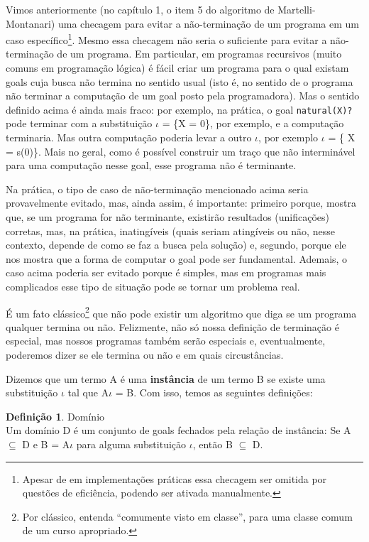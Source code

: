 \documentclass{article}
\theoremstyle{definition}
\newtheorem{definition}{Definição}[section]
\theoremstyle{remark}
\begin{document}
Vimos anteriormente (no capítulo 1, o item 5 do algoritmo de Martelli-Montanari) uma checagem para evitar a não-terminação de um programa em um caso específico\footnote{Apesar de em implementações práticas essa checagem ser omitida por questões de eficiência, podendo ser ativada manualmente.}. Mesmo essa checagem não seria o suficiente para evitar a não-terminação de um programa. Em
particular, em programas recursivos (muito comuns em programação lógica) é fácil criar um programa para o qual existam goals cuja busca não termina no sentido usual (isto é, no sentido de o programa não terminar a computação de um goal posto pela programadora). Mas o sentido definido acima é ainda mais fraco: por exemplo, na prática, o goal {\tt natural(X)?} pode terminar com a substituição $\iota$ = \{X = 0\}, por exemplo, e a computação terminaria. Mas outra computação poderia
levar a outro $\iota$, por exemplo $\iota$ = \{ X = s(0)\}. Mais no geral, como é possível construir um traço que não interminável para uma computação nesse goal, esse programa não é terminante.

Na prática, o tipo de caso de não-terminação mencionado acima seria provavelmente evitado, mas, ainda assim, é importante: primeiro porque, mostra que, se um programa for não terminante, existirão resultados (unificações) corretas, mas, na prática, inatingíveis (quais seriam atingíveis ou não, nesse contexto, depende de como se faz a busca pela solução) e, segundo, porque ele nos mostra que a forma de computar o goal pode ser fundamental. Ademais, o caso acima poderia ser evitado porque é simples,
mas em programas mais complicados esse tipo de situação pode se tornar um problema real.

É um fato clássico\footnote{Por clássico, entenda ``comumente visto em classe'', para uma classe comum de um curso apropriado.} que não pode existir um algoritmo que diga se um programa qualquer termina ou não. Felizmente, não só nossa definição de terminação é especial, mas nossos programas também serão especiais e, eventualmente, poderemos dizer se ele termina ou não e em quais circustâncias.

Dizemos que um termo A é uma \textbf{instância} de um termo B se existe uma substituição $\iota$ tal que A$\iota$ = B. Com isso, temos as seguintes definições:

\begin{definition}{Domínio}
  \\Um domínio D é um conjunto de goals fechados pela relação de instância: Se A $\subseteq$ D e B = A$\iota$ para alguma substituição $\iota$, então B $\subseteq$ D.
  \end{definition}
\end{document}
